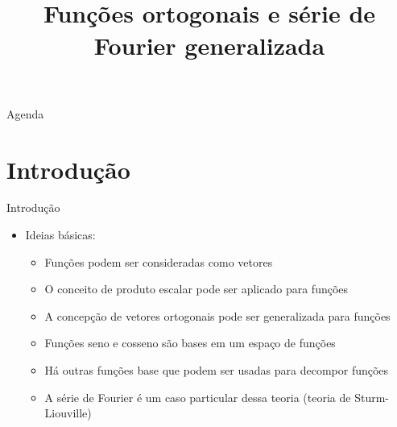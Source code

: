 


\title{\cursogrande\\ \vspace{1cm}Funções ortogonais e série de Fourier generalizada}


   \maketitle[randomdots={false}]
   \begin{slide}{Agenda}
      \tableofcontents[content=sections]
   \end{slide}

   \section[ slide = true ]{Introdução}
      \begin{slide}[toc=]{Introdução}
		\begin{itemize}
			\item Ideias básicas: 
				\begin{itemize}
					\item Funções podem ser consideradas como vetores 
					\item O conceito de produto escalar pode ser aplicado para funções
					\item A concepção de vetores ortogonais pode ser generalizada para funções
					\item Funções seno e cosseno são bases em um espaço de funções
					\item Há outras funções base que podem ser usadas para decompor funções
					\item A série de Fourier é um caso particular dessa teoria (teoria de Sturm-Liouville) 
				\end{itemize}
		\end{itemize}
      \end{slide}

      
